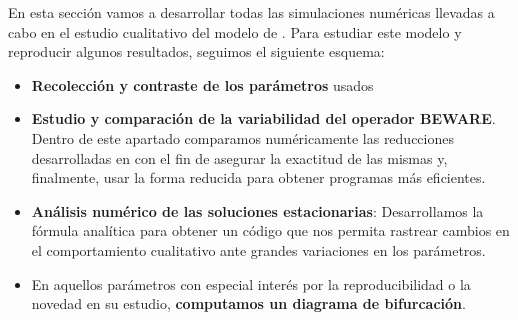 En esta sección vamos a desarrollar todas las simulaciones numéricas llevadas a cabo en el estudio cualitativo del modelo de \cite{schaffer}.
Para estudiar este modelo y reproducir algunos resultados, seguimos el siguiente esquema:
\begin{itemize}
	\item \textbf{Recolección y contraste de los parámetros} usados
	\item \textbf{Estudio y comparación de la variabilidad del operador BEWARE}. Dentro de este apartado comparamos numéricamente las reducciones desarrolladas en \cite{multiple} con el fin de asegurar la exactitud de las mismas y, finalmente, usar la forma reducida para obtener programas más eficientes.
	\item \textbf{Análisis numérico de las soluciones estacionarias}: Desarrollamos la fórmula analítica para obtener un código que nos permita rastrear cambios en el comportamiento cualitativo ante grandes variaciones en los parámetros.
	\item En aquellos parámetros con especial interés por la reproducibilidad o la novedad en su estudio, \textbf{computamos un diagrama de bifurcación}.
\end{itemize}
